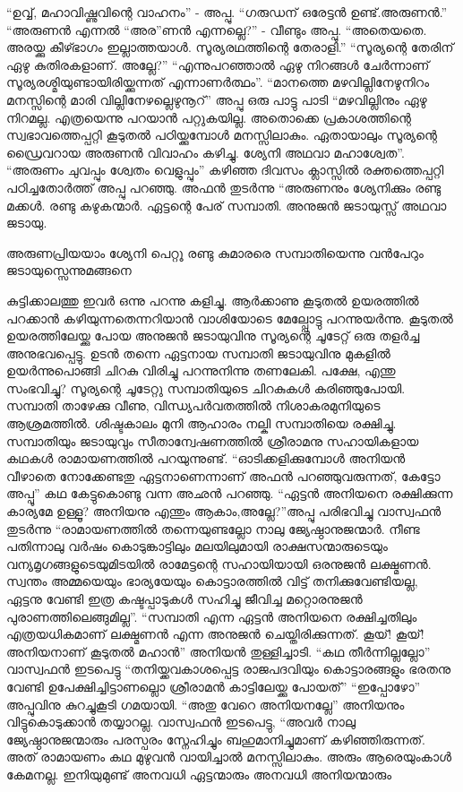 “ഉവ്വ്, മഹാവിഷ്ണുവിന്റെ വാഹനം” - അപ്പു.
“ഗരുഡന്‌ ഒരേട്ടൻ ഉണ്ട്.അരുണൻ.”
“അരുണൻ എന്നൽ “അര”ണൻ എന്നല്ലെ?” - വീണ്ടും അപ്പു.
“അതെയതെ. അരയ്ക്കു കീഴ്ഭാഗം ഇല്ലാത്തയാൾ. സൂര്യരഥത്തിന്റെ തേരാളി.”
“സൂര്യന്റെ തേരിന്‌ ഏഴു കുതിരകളാണ്‌. അല്ലേ?”
“എന്നുപറഞ്ഞാൽ ഏഴു നിറങ്ങൾ ചേർന്നാണ് സൂര്യരശ്മിയുണ്ടായിരിയ്ക്കുന്നത് എന്നാണർത്ഥം”.
“മാനത്തെ മഴവില്ലിനേഴുനിറം
മനസ്സിന്റെ മാരി വില്ലിനേഴല്ലെഴുനൂറ്‌” അപ്പു ഒരു പാട്ടു പാടി
“മഴവില്ലിനും ഏഴു നിറമല്ല. എത്രയെന്നു പറയാൻ പറ്റുകയില്ല. അതൊക്കെ പ്രകാശത്തിന്റെ സ്വഭാവത്തെപ്പറ്റി കൂടുതൽ പഠിയ്ക്കുമ്പോൾ മനസ്സിലാകും. ഏതായാലും സൂര്യന്റെ ഡ്രൈവറായ അരുണൻ വിവാഹം കഴിച്ചു. ശ്യേനി അഥവാ മഹാശ്വേത”.
“അരുണം ചുവപ്പും ശ്വേതം വെളുപ്പും” കഴിഞ്ഞ ദിവസം ക്ലാസ്സിൽ രക്തത്തെപ്പറ്റി പഠിച്ചതോർത്ത് അപ്പു പറഞ്ഞു.
അഫൻ തുടർന്നു “അരുണനും ശ്യേനിക്കും രണ്ടു മക്കൾ. രണ്ടു കഴുകന്മാർ. ഏട്ടന്റെ പേര്‌ സമ്പാതി. അനുജൻ ജടായുസ്സ് അഥവാ ജടായു.
\begin{center}
അരുണപ്രിയയാം ശ്യേനി
പെറ്റൂ രണ്ടു കുമാരരെ
സമ്പാതിയെന്നു വൻപേറും
ജടായുസ്സെന്നുമങ്ങനെ
\end{center}
കുട്ടിക്കാലത്തു ഇവർ ഒന്നു പറന്നു കളിച്ചു. ആർക്കാണു കൂടുതൽ ഉയരത്തിൽ പറക്കാൻ കഴിയുന്നതെന്നറിയാൻ വാശിയോടെ മേല്പ്പോട്ടു പറന്നുയർന്നു. കൂടുതൽ ഉയരത്തിലേയ്ക്കു പോയ അനുജൻ ജടായുവിനു സൂര്യന്റെ ചൂടേറ്റ് ഒരു തളർച്ച അനുഭവപ്പെട്ടു. ഉടൻ തന്നെ ഏട്ടനായ സമ്പാതി ജടായുവിനു മുകളിൽ ഉയർന്നുപൊങ്ങി ചിറകു വിരിച്ചു പറന്നുനിന്നു തണലേകി. പക്ഷേ, എന്തു സംഭവിച്ചു? സൂര്യന്റെ ചൂടേറ്റു സമ്പാതിയുടെ ചിറകുകൾ കരിഞ്ഞുപോയി. സമ്പാതി താഴേക്കു വീണു, വിന്ധ്യപർവതത്തിൽ നിശാകരമുനിയുടെ ആശ്രമത്തിൽ. ശിഷ്ടകാലം മുനി ആഹാരം നല്കി സമ്പാതിയെ രക്ഷിച്ചു. സമ്പാതിയും ജടായുവും സീതാന്വേഷണത്തിൽ ശ്രീരാമനു സഹായികളായ കഥകൾ രാമായണത്തിൽ പറയുന്നുണ്ട്.
“ഓടിക്കളിക്കുമ്പോൾ അനിയൻ വീഴാതെ നോക്കേണ്ടതു ഏട്ടനാണെന്നാണ്‌ അഫൻ പറഞ്ഞുവരുന്നത്, കേട്ടോ അപ്പൂ” കഥ കേട്ടുകൊണ്ടു വന്ന അഛൻ പറഞ്ഞു.
“ഏട്ടൻ അനിയനെ രക്ഷിക്കുന്ന കാര്യമേ ഉള്ളൂ? അനിയനു എന്തും ആകാം,അല്ലേ?”അപ്പു പരിഭവിച്ചു
വാസ്വഫൻ തുടർന്നു
“രാമായണത്തിൽ തന്നെയുണ്ടല്ലോ നാലു ജ്യേഷ്ഠാനുജന്മാർ. നീണ്ട പതിന്നാലു വർഷം കൊടുങ്കാട്ടിലും മലയിലുമായി രാക്ഷസന്മാരുടെയും വന്യമൃഗങ്ങളുടെയുമിടയിൽ രാമേട്ടന്റെ സഹായിയായി ഒരനുജൻ ലക്ഷ്മണൻ. സ്വന്തം അമ്മയെയും ഭാര്യയേയും കൊട്ടാരത്തിൽ വിട്ട് തനിക്കുവേണ്ടിയല്ല, ഏട്ടനു വേണ്ടി ഇത്ര കഷ്ടപ്പാടുകൾ സഹിച്ചു ജീവിച്ച മറ്റൊരനുജൻ പുരാണത്തിലെങ്ങുമില്ല”.
“സമ്പാതി എന്ന ഏട്ടൻ അനിയനെ രക്ഷിച്ചതിലും എത്രയധികമാണ്‌ ലക്ഷ്മണൻ എന്ന അനുജൻ ചെയ്തിരിക്കുന്നത്. കൂയ്! കൂയ്! അനിയനാണ്‌ കൂടുതൽ മഹാൻ” അനിയൻ തുള്ളിച്ചാടി.
“കഥ തീർന്നില്ലല്ലോ” വാസ്വഫൻ ഇടപെട്ടു “തനിയ്ക്കവകാശപ്പെട്ട രാജപദവിയും കൊട്ടാരങ്ങളും ഭരതനു വേണ്ടി ഉപേക്ഷിച്ചിട്ടാണല്ലൊ ശ്രീരാമൻ കാട്ടിലേയ്ക്കു പോയത്”
“ഇപ്പോഴോ” അപ്പുവിനു കുറച്ചുകൂടി ഗമയായി.
“അതു വേറെ അനിയനല്ലേ” അനിയനും വിട്ടുകൊടുക്കാൻ തയ്യാറല്ല.
വാസ്വഫൻ ഇടപെട്ടു, “അവർ നാലു ജ്യേഷ്ഠാനുജന്മാരും പരസ്പരം സ്നേഹിച്ചും ബഹുമാനിച്ചുമാണ്‌ കഴിഞ്ഞിരുന്നത്. അത് രാമായണം കഥ മുഴുവൻ വായിച്ചാൽ മനസ്സിലാകും. അരും ആരെയുംകാൾ കേമനല്ല. ഇനിയുമുണ്ട് അനവധി ഏട്ടന്മാരും അനവധി അനിയന്മാരും

